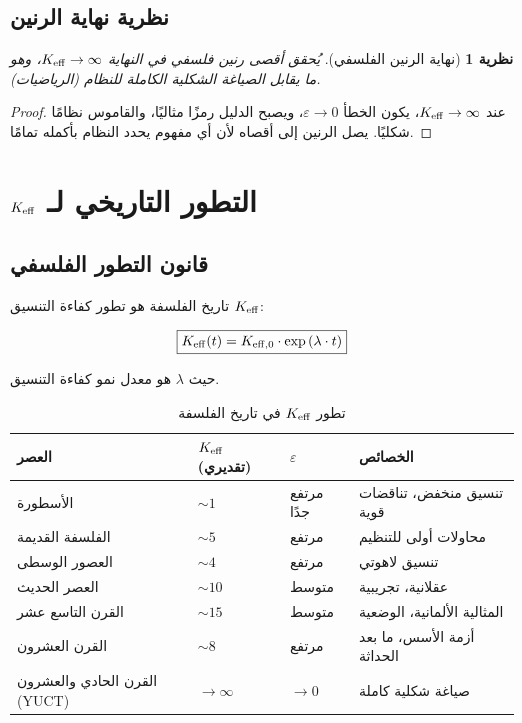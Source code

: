 \documentclass[11pt,a4paper]{article}
\newtheorem{theorem}{نظرية}[section]
\newcommand{\eps}{\varepsilon}
\begin{document}
	\subsection{نظرية نهاية الرنين}
	
	\begin{theorem}[نهاية الرنين الفلسفي]
		يُحقق أقصى رنين فلسفي في النهاية \(\Keff \to \infty\)، وهو ما يقابل الصياغة الشكلية الكاملة للنظام (الرياضيات).
	\end{theorem}
	
	\begin{proof}
		عند \(\Keff \to \infty\)، يكون الخطأ \(\eps \to 0\)، ويصبح الدليل رمزًا مثاليًا، والقاموس نظامًا شكليًا. يصل الرنين إلى أقصاه لأن أي مفهوم يحدد النظام بأكمله تمامًا.
	\end{proof}
	
	\section{\texorpdfstring{\(\Keff\)}{K\_eff} التطور التاريخي لـ}
	
	\subsection{قانون التطور الفلسفي}
	
	تاريخ الفلسفة هو تطور كفاءة التنسيق \(\Keff\):
	
	\begin{equation}
		\boxed{
			\Keff(t) = \Keff[0] \cdot \exp\left(\lambda \cdot t\right)
		}
	\end{equation}
	
	حيث \(\lambda\) هو معدل نمو كفاءة التنسيق.
	
	\begin{table}[H]
		\centering
		\caption{تطور \(\Keff\) في تاريخ الفلسفة}
		\begin{tabular}{p{3cm}p{3cm}p{3cm}p{4cm}}
			\toprule
			\textbf{العصر} & \(\Keff\) (تقديري) & \(\eps\) & \textbf{الخصائص} \\
			\midrule
			الأسطورة & \(\sim 1\) & مرتفع جدًا & تنسيق منخفض، تناقضات قوية \\
			الفلسفة القديمة & \(\sim 5\) & مرتفع & محاولات أولى للتنظيم \\
			العصور الوسطى & \(\sim 4\) & مرتفع & تنسيق لاهوتي \\
			العصر الحديث & \(\sim 10\) & متوسط & عقلانية، تجريبية \\
			القرن التاسع عشر & \(\sim 15\) & متوسط & المثالية الألمانية، الوضعية \\
			القرن العشرون & \(\sim 8\) & مرتفع & أزمة الأسس، ما بعد الحداثة \\
			القرن الحادي والعشرون (YUCT) & \(\to \infty\) & \(\to 0\) & صياغة شكلية كاملة \\
			\bottomrule
		\end{tabular}
	\end{table}
	
\end{document}
